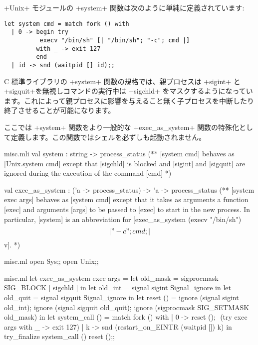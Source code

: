 \begin{example}
\ml+Unix+ モジュールの \ml+system+ 関数は次のように単純に定義されています:
%
\begin{lstlisting}
let system cmd = match fork () with
  | 0 -> begin try
          execv "/bin/sh" [| "/bin/sh"; "-c"; cmd |]
         with _ -> exit 127
         end
  | id -> snd (waitpid [] id);;
\end{lstlisting}
%
C 標準ライブラリの \ml+system+ 関数の規格では、親プロセスは \ml+sigint+ と \ml+sigquit+を無視しコマンドの実行中は \ml+sigchld+ をマスクするようになっています。これによって親プロセスに影響を与えること無く子プロセスを中断したり終了させることが可能になります。

ここでは \ml+system+ 関数をより一般的な \ml+exec_as_system+ 関数の特殊化として定義します。この関数ではシェルを必ずしも起動されません。
%
\begin{codefile}{misc.mli}
val system : string -> process_status
(** [system cmd] behaves as [Unix.system cmd] except that [sigchld] is
blocked and [sigint] and [sigquit] are ignored during the execution
of the command [cmd] *)

val exec_as_system : ('a -> process_status) -> 'a -> process_status
(** [system exec args] behaves as [system cmd] except that it takes as
arguments a function [exec] and arguments [args] to be passed to [exec]
to start in the new process. In particular, [system] is an abbreviation for
[exec_as_system (execv "/bin/sh") \[|"-c"; cmd; |\] v]. *)
\end{codefile}
%
\begin{codefile}{misc.ml}
open Sys;;
open Unix;;
\end{codefile}
%
\begin{listingcodefile}[style=numbers]{misc.ml}
let exec_as_system exec args =
  let old_mask = sigprocmask SIG_BLOCK [ sigchld ] in
  let old_int = signal sigint Signal_ignore in
  let old_quit = signal sigquit Signal_ignore in
  let reset () =
    ignore (signal sigint old_int);
    ignore (signal sigquit old_quit);
    ignore (sigprocmask SIG_SETMASK old_mask) in
  let system_call () = match fork () with
    | 0 ->
        reset (); $\label{prog:sreset}$
        (try exec args with _ -> exit 127)
    | k ->
        snd (restart_on_EINTR (waitpid []) k) in
  try_finalize system_call () reset ();; $\label{prog:stry}$


\end{listingcodefile}
\end{example}
